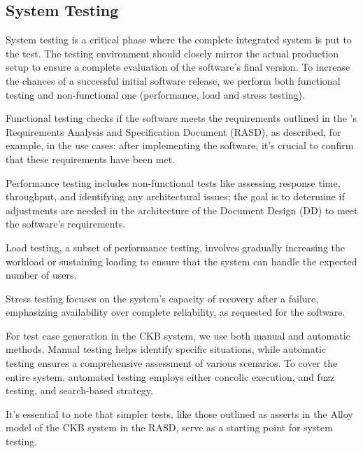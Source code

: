
\subsection{System Testing}

System testing is a critical phase where the complete integrated system is put to the test. The testing environment should closely mirror the actual production setup to ensure a complete evaluation of the software's final version. To increase the chances of a successful initial software release, we perform both functional testing and non-functional one (performance, load and stress testing). 

Functional testing checks if the software meets the requirements outlined in the \app's Requirements Analysis and Specification Document (RASD), as described, for example, in the use cases: after implementing the software, it's crucial to confirm that these requirements have been met.

Performance testing includes non-functional tests like assessing response time, throughput, and identifying any architectural issues; the goal is to determine if adjustments are needed in the architecture of the Document Design (DD) to meet the software's requirements. 

Load testing, a subset of performance testing, involves gradually increasing the workload or sustaining loading to ensure that the system can handle the expected number of users. 

Stress testing focuses on the system's capacity of recovery after a failure, emphasizing availability over complete reliability, as requested for the software.

For test case generation in the CKB system, we use both manual and automatic methods. Manual testing helps identify specific situations, while automatic testing ensures a comprehensive assessment of various scenarios. To cover the entire system, automated testing employs either concolic execution, and fuzz testing, and search-based strategy.

It's essential to note that simpler tests, like those outlined as asserts in the Alloy model of the CKB system in the RASD, serve as a starting point for system testing.

